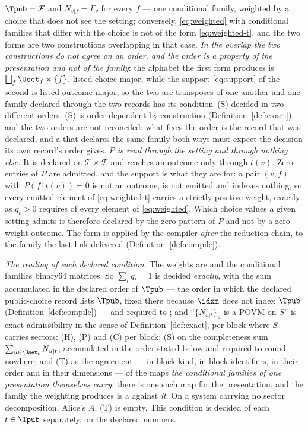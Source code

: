 \begin{definition}
$\Tpub=\mathcal{F}$ and $N_{v|f}=F_v$ for every $f$ --- one conditional
family, weighted by a choice that does not see the setting; conversely,
\eqref{eq:weighted} with conditional families that differ with the choice is
not of the form \eqref{eq:weighted-t}, and the two forms are two constructions
overlapping in that case. \emph{In the overlap the two constructions do not
agree on an order, and the order is a property of the presentation and not of
the family}: the alphabet the first form produces is
$\bigsqcup_f\Uset_f\times\{f\}$, listed choice-major, while the support
\eqref{eq:support} of the second is listed outcome-major, so the two are
transposes of one another and one family declared through the two records has
its condition~(S) decided in two different orders. (S) is order-dependent by
construction (Definition~\ref{def:exact}), and the two orders are not
reconciled: what fixes the order is the record that was declared, and a
 that declares the same family both ways must expect the
decision its own record's order gives. \emph{$P$ is read through the setting
and through nothing else.} It is declared on $\mathcal{T}\times\mathcal{F}$
and reaches an outcome only through $t(v)$. Zero entries of $P$ are admitted, and the support
is what they are for: a pair $(v,f)$ with $P(f\,|\,t(v))=0$ is not an outcome,
is not emitted and indexes nothing, so every emitted element of
\eqref{eq:weighted-t} carries a strictly positive weight, exactly as $q_t>0$
requires of every element of \eqref{eq:weighted}. Which choice values a given
setting admits is therefore declared by the zero pattern of $P$ and not by a
zero-weight outcome. The
form is applied by the compiler \emph{after} the reduction chain, to the
family the last link delivered (Definition~\ref{def:compile}).

\emph{The reading of each declared condition.} The weights are
 and the conditional families binary64 matrices. So
$\sum_tq_t=1$ is decided
\emph{exactly}, with the sum accumulated in the declared order of $\Tpub$ ---
the order in which the declared public-choice record lists $\Tpub$, fixed
there because $\idxm$ does not index $\Tpub$
(Definition~\ref{def:compile}) --- and
required to ; and ``$\{N_{u|t}\}_u$ is a
POVM on $S$'' is exact admissibility in the sense of
Definition~\ref{def:exact}, per block where $S$ carries sectors: (H), (P) and
(C) per block; (S) on the completeness sum $\sum_{u\in\Uset_t}N_{u|t}$,
accumulated in the order stated below and required to round nowhere; and (T)
as the agreement --- in block kind, in block identifiers, in their order and in
their dimensions --- of the maps \emph{the conditional families of one
presentation themselves carry}: there is one such map for the presentation,
and the family the weighting produces is a  against
\emph{it}. On a system carrying no sector decomposition, Alice's $A$, (T) is
empty. This condition is decided of each $t\in\Tpub$ separately, on the
declared numbers.


\end{definition}
